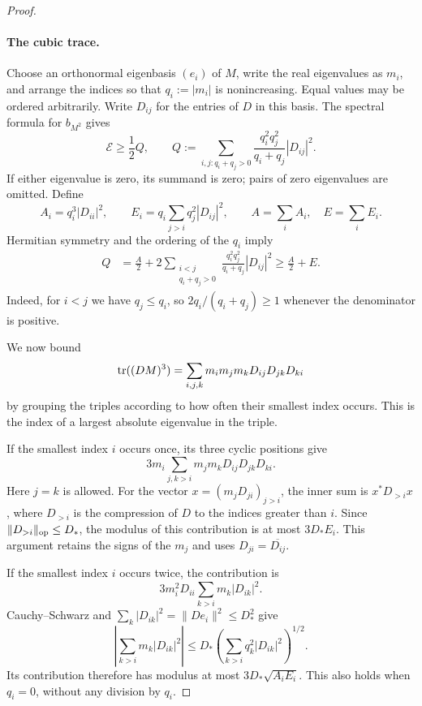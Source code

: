 \begin{proof}
\paragraph{The cubic trace.}
Choose an orthonormal eigenbasis $(e_i)$ of $M$, write the real
eigenvalues as $m_i$, and arrange the indices so that $q_i:=|m_i|$ is
nonincreasing. Equal values may be ordered arbitrarily. Write $D_{ij}$
for the entries of $D$ in this basis. The spectral formula for
$b_{M^2}$ gives
\begin{equation}\label{eq:trace-Q}
 \mathcal E\ge\frac12Q,
 \qquad
 Q:=\sum_{i,j:q_i+q_j>0}
 \frac{q_i^2q_j^2}{q_i+q_j}|D_{ij}|^2.
\end{equation}
If either eigenvalue is zero, its summand is zero; pairs of zero
eigenvalues are omitted. Define
\[
 A_i=q_i^3|D_{ii}|^2,\qquad
 E_i=q_i\sum_{j>i}q_j^2|D_{ij}|^2,
 \qquad A=\sum_iA_i,\quad E=\sum_iE_i.
\]
Hermitian symmetry and the ordering of the $q_i$ imply
\begin{equation}\label{eq:trace-AE}
 \begin{aligned}
 Q
 &=\frac A2+
 2\sum_{\substack{i<j\\q_i+q_j>0}}
 \frac{q_i^2q_j^2}{q_i+q_j}|D_{ij}|^2
 \ge\frac A2+E.
 \end{aligned}
\end{equation}
Indeed, for $i<j$ we have $q_j\le q_i$, so
$2q_i/(q_i+q_j)\ge1$ whenever the denominator is positive.

We now bound
\[
 \operatorname{tr}((DM)^3)
 =\sum_{i,j,k}m_im_jm_kD_{ij}D_{jk}D_{ki}
\]
by grouping the triples according to how often their smallest index
occurs. This is the index of a largest absolute eigenvalue in the
triple.

If the smallest index $i$ occurs once, its three cyclic positions
give
\[
 3m_i\sum_{j,k>i}m_jm_kD_{ij}D_{jk}D_{ki}.
\]
Here $j=k$ is allowed. For the vector $x=(m_jD_{ji})_{j>i}$, the inner
sum is $x^*D_{>i}x$, where $D_{>i}$ is the compression of $D$ to the
indices greater than $i$. Since
$\lVert D_{>i}\rVert_{\mathrm{op}}\le D_*$, the modulus of this contribution
is at most $3D_*E_i$. This argument retains the signs of the $m_j$
and uses $D_{ji}=\overline{D_{ij}}$.

If the smallest index $i$ occurs twice, the contribution is
\[
 3m_i^2D_{ii}\sum_{k>i}m_k|D_{ik}|^2.
\]
Cauchy--Schwarz and
$\sum_k|D_{ik}|^2=\lVert De_i\rVert^2\le D_*^2$ give
\[
 \left|\sum_{k>i}m_k|D_{ik}|^2\right|
 \le D_*\left(\sum_{k>i}q_k^2|D_{ik}|^2\right)^{1/2}.
\]
Its contribution therefore has modulus at most
$3D_*\sqrt{A_iE_i}$. This also holds when $q_i=0$, without any
division by $q_i$.


\end{proof}
